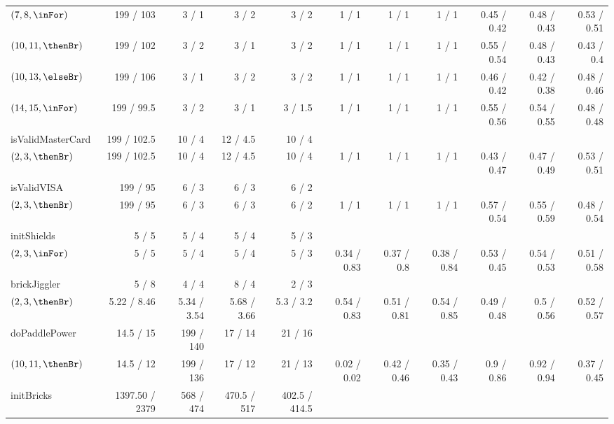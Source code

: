 \begin{table*}
{\begin{tabular}{l|rrrr|r|r|r|r|r|r}
    $(7,8,\inFor)$    & 199 / 103   & 3 / 1  & 3 / 2  & 3 / 2    & 1 / 1 & 1 / 1 & 1 / 1 & 0.45 / 0.42 & 0.48 / 0.43 & 0.53 / 0.51 \\
    $(10,11,\thenBr)$ & 199 / 102   & 3 / 2  & 3 / 1  & 3 / 2    & 1 / 1 & 1 / 1 & 1 / 1 & 0.55 / 0.54 & 0.48 / 0.43 & 0.43 / 0.4 \\
    $(10,13,\elseBr)$ & 199 / 106   & 3 / 1  & 3 / 2  & 3 / 2    & 1 / 1 & 1 / 1 & 1 / 1 & 0.46 / 0.42 & 0.42 / 0.38 & 0.48 / 0.46 \\
    $(14,15,\inFor)$  & 199 / 99.5  & 3 / 2  & 3 / 1  & 3 / 1.5  & 1 / 1 & 1 / 1 & 1 / 1 & 0.55 / 0.56 & 0.54 / 0.55 & 0.48 / 0.48 \\
    \midrule
    isValidMasterCard  & 199 / 102.5 & 10 / 4 & 12 / 4.5 & 10 / 4 &            &           &       &             &             & \\
    $(2,3,\thenBr)$    & 199 / 102.5 & 10 / 4 & 12 / 4.5 & 10 / 4 & 1 / 1      & 1 / 1     & 1 / 1 & 0.43 / 0.47 & 0.47 / 0.49 & 0.53 / 0.51 \\
    \midrule
    isValidVISA       & 199 / 95 & 6 / 3 & 6 / 3 & 6 / 2 &       &       &       &             &             & \\
    $(2,3,\thenBr)$   & 199 / 95 & 6 / 3 & 6 / 3 & 6 / 2 & 1 / 1 & 1 / 1 & 1 / 1 & 0.57 / 0.54 & 0.55 / 0.59 & 0.48 / 0.54 \\
    \midrule
    \midrule
    initShields       & 5 / 5 & 5 / 4 & 5 / 4 & 5 / 3 &             &            &             &             &             & \\
    $(2,3,\inFor)$    & 5 / 5 & 5 / 4 & 5 / 4 & 5 / 3 & 0.34 / 0.83 & 0.37 / 0.8 & 0.38 / 0.84 & 0.53 / 0.45 & 0.54 / 0.53 & 0.51 / 0.58 \\
    \midrule
    \midrule
    brickJiggler      & 5 / 8       & 4 / 4       & 8 / 4       & 2 / 3      &             &             &             &             &            &\\
    $(2,3,\thenBr)$   & 5.22 / 8.46 & 5.34 / 3.54 & 5.68 / 3.66 & 5.3 / 3.2  & 0.54 / 0.83 & 0.51 / 0.81 & 0.54 / 0.85 & 0.49 / 0.48 & 0.5 / 0.56 & 0.52 / 0.57 \\
    \midrule
    doPaddlePower        & 14.5 / 15 & 199 / 140 & 17 / 14 & 21 / 16 &             &             &             &            &             & \\
    $(10,11,\thenBr)$    & 14.5 / 12 & 199 / 136 & 17 / 12 & 21 / 13 & 0.02 / 0.02 & 0.42 / 0.46 & 0.35 / 0.43 & 0.9 / 0.86 & 0.92 / 0.94 & 0.37 / 0.45 \\
    \midrule
    initBricks        & 1397.50 / 2379  & 568  / 474  & 470.5 / 517   & 402.5 / 414.5 &             &            &            &               &             & \\

\end{tabular}}
\end{table*}
